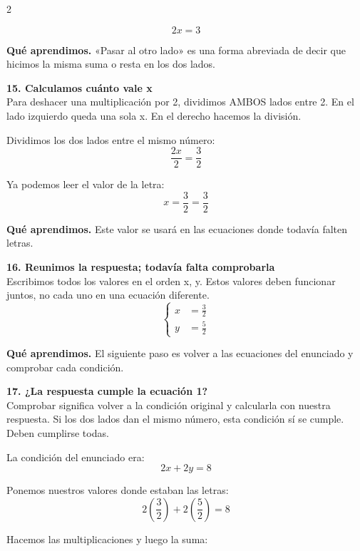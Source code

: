 \documentclass[11pt,a4paper,landscape]{article}
\begin{document}
\begin{multicols*}{2}
\begin{minipage}{\linewidth}
\[2x=3\]
\par\smallskip\textbf{Qué aprendimos.} «Pasar al otro lado» es una forma abreviada de decir que hicimos la misma suma o resta en los dos lados.
\end{minipage}\par\medskip
\noindent\begin{minipage}{\linewidth}\textbf{15. Calculamos cuánto vale x}\\[2pt]Para deshacer una multiplicación por 2, dividimos AMBOS lados entre 2. En el lado izquierdo queda una sola x. En el derecho hacemos la división.
\par\smallskip Dividimos los dos lados entre el mismo número:
\[\frac{2x}{2}=\frac{3}{2}\]
\par\smallskip Ya podemos leer el valor de la letra:
\[x=\frac{3}{2}=\frac{3}{2}\]
\par\smallskip\textbf{Qué aprendimos.} Este valor se usará en las ecuaciones donde todavía falten letras.
\end{minipage}\par\medskip
\noindent\begin{minipage}{\linewidth}\textbf{16. Reunimos la respuesta; todavía falta comprobarla}\\[2pt]Escribimos todos los valores en el orden x, y. Estos valores deben funcionar juntos, no cada uno en una ecuación diferente.
\[\left\{\begin{aligned}x&=\frac{3}{2}\\y&=\frac{5}{2}\end{aligned}\right.\]
\par\smallskip\textbf{Qué aprendimos.} El siguiente paso es volver a las ecuaciones del enunciado y comprobar cada condición.
\end{minipage}\par\medskip
\noindent\begin{minipage}{\linewidth}\textbf{17. ¿La respuesta cumple la ecuación 1?}\\[2pt]Comprobar significa volver a la condición original y calcularla con nuestra respuesta. Si los dos lados dan el mismo número, esta condición sí se cumple. Deben cumplirse todas.
\par\smallskip La condición del enunciado era:
\[2x + 2y = 8\]
\par\smallskip Ponemos nuestros valores donde estaban las letras:
\[2\left(\frac{3}{2}\right) + 2\left(\frac{5}{2}\right)=8\]
\par\smallskip Hacemos las multiplicaciones y luego la suma:

\end{minipage}
\end{multicols*}
\end{document}

